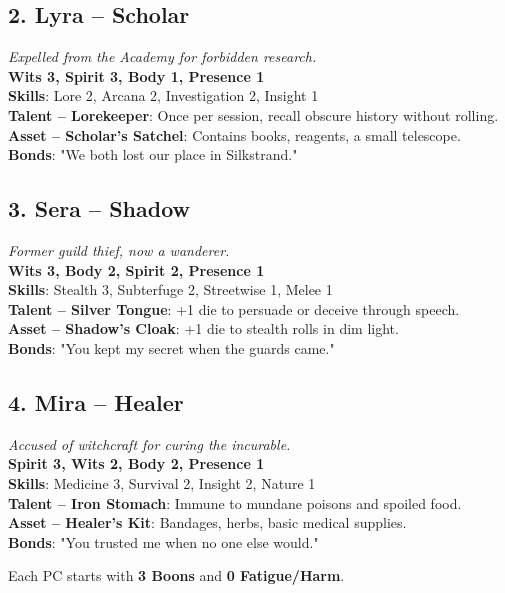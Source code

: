 \documentclass[10pt, twocolumn]{article}
\begin{document}
\subsection*{2. Lyra -- Scholar}
\textit{Expelled from the Academy for forbidden research.}\\
\textbf{Wits 3, Spirit 3, Body 1, Presence 1}\\
\textbf{Skills}: Lore 2, Arcana 2, Investigation 2, Insight 1\\
\textbf{Talent -- Lorekeeper}: Once per session, recall obscure history without rolling.\\
\textbf{Asset -- Scholar's Satchel}: Contains books, reagents, a small telescope.\\
\textbf{Bonds}: "We both lost our place in Silkstrand."

\subsection*{3. Sera -- Shadow}
\textit{Former guild thief, now a wanderer.}\\
\textbf{Wits 3, Body 2, Spirit 2, Presence 1}\\
\textbf{Skills}: Stealth 3, Subterfuge 2, Streetwise 1, Melee 1\\
\textbf{Talent -- Silver Tongue}: +1 die to persuade or deceive through speech.\\
\textbf{Asset -- Shadow's Cloak}: +1 die to stealth rolls in dim light.\\
\textbf{Bonds}: "You kept my secret when the guards came."

\subsection*{4. Mira -- Healer}
\textit{Accused of witchcraft for curing the incurable.}\\
\textbf{Spirit 3, Wits 2, Body 2, Presence 1}\\
\textbf{Skills}: Medicine 3, Survival 2, Insight 2, Nature 1\\
\textbf{Talent -- Iron Stomach}: Immune to mundane poisons and spoiled food.\\
\textbf{Asset -- Healer's Kit}: Bandages, herbs, basic medical supplies.\\
\textbf{Bonds}: "You trusted me when no one else would."
\vspace{0.2cm}

\noindent Each PC starts with \textbf{3 Boons} and \textbf{0 Fatigue/Harm}.
\end{document}
